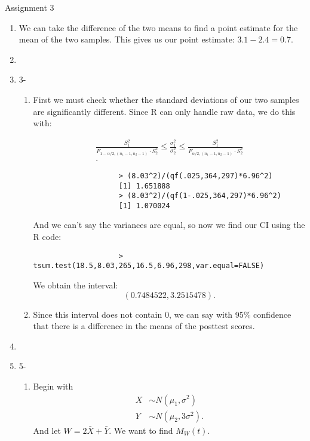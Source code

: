 \documentclass{article}
\begin{document}
    \huge Assignment 3
    \normalsize
\begin{enumerate} 

    \item We can take the difference
        of the two means to find a point estimate for the mean of the two samples.
        This gives us our point estimate: $3.1-2.4=0.7$.
    \item 
    \item 3-
        \begin{enumerate}[label= (\alph*)] 
            \item First we must check whether the standard deviations of our 
                two samples are significantly different. Since R can only handle
                raw data, we do this with:

                \begin{align*}
                    \frac{S_1^2}{F_{1-\alpha/2,(n_1-1,n_2-1)}\cdot S_2^2}\leq\frac{\sigma_1^2}{\sigma_2^2}\leq\frac{S_1^2}{F_{\alpha/2,(n_1-1,n_2-1)}\cdot S_2^2}\\
                .\end{align*}
                \begin{verbatim}
                    > (8.03^2)/(qf(.025,364,297)*6.96^2)
                    [1] 1.651888
                    > (8.03^2)/(qf(1-.025,364,297)*6.96^2)
                    [1] 1.070024
                \end{verbatim}
                And we can't say the variances are equal, so now we find our CI
                using the R code:
                \begin{verbatim}
                    > tsum.test(18.5,8.03,265,16.5,6.96,298,var.equal=FALSE)
                \end{verbatim}
                We obtain the interval: 
                \[
                    (0.7484522,3.2515478)
                .\] 
            \item Since this interval does not contain 0, we can say with 95\% 
                confidence that there is a difference in the means of the 
                posttest scores.
        \end{enumerate}
    \item 
    \item 5- 
        \begin{enumerate}[label= (\alph*)] 
            \item Begin with
            \begin{align*}
                X&\sim N(\mu_1,\sigma^2)\\
                Y&\sim N(\mu_2,3\sigma^2)
            .\end{align*}
            And let $W=2\bar{X}+\bar{Y}$. We want to find $M_W(t)$.


\end{enumerate}
\end{enumerate}
\end{document}
